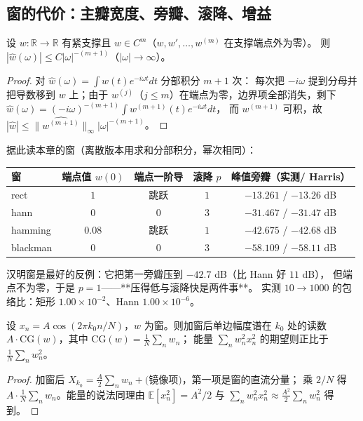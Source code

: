 \subsection{窗的代价：主瓣宽度、旁瓣、滚降、增益}

\begin{lemma}[端点光滑度决定滚降幂次]
\label{lem:rolloff}
设 $w:\mathbb R\to\mathbb R$ 有紧支撑且 $w\in C^m$（$w,w',\dots,w^{(m)}$ 在支撑端点外为零）。
则 $|\hat w(\omega)|\le C|\omega|^{-(m+1)}$（$|\omega|\to\infty$）。
\end{lemma}

\begin{proof}
对 $\hat w(\omega)=\int w(t)e^{-i\omega t}dt$ 分部积分 $m+1$ 次：
每次把 $-i\omega$ 提到分母并把导数移到 $w$ 上；由于
$w^{(j)}$（$j\le m$）在端点为零，边界项全部消失，剩下
$\hat w(\omega)=(-i\omega)^{-(m+1)}\int w^{(m+1)}(t)e^{-i\omega t}dt$，
而 $w^{(m+1)}$ 可积，故 $|\hat w|\le\|\hat{w^{(m+1)}}\|_\infty|\omega|^{-(m+1)}$。
\end{proof}

据此读本章的窗（离散版本用求和分部积分，幂次相同）：

\begin{center}
\begin{tabular}{lcccc}
窗 & 端点值 $w(0)$ & 端点一阶导 & 滚降 $p$ & 峰值旁瓣（实测/ Harris）\\
\hline
rect & $1$ & 跳跃 & $1$ & $-13.261$ / $-13.26$ dB\\
hann & $0$ & $0$ & $3$ & $-31.467$ / $-31.47$ dB\\
hamming & $0.08$ & 跳跃 & $1$ & $-42.675$ / $-42.68$ dB\\
blackman & $0$ & $0$ & $3$ & $-58.109$ / $-58.11$ dB\\
\end{tabular}
\end{center}

汉明窗是最好的反例：它把第一旁瓣压到 $-42.7$ dB（比 Hann 好 $11$ dB），
但端点不为零，于是 $p=1$——**压得低与滚降快是两件事**。
实测 $10\to1000$ 的包络比：矩形 $1.00\times10^{-2}$、Hann $1.00\times10^{-6}$。

\begin{theorem}[加窗的幅度代价 = 相干增益]
\label{thm:coherent-gain}
设 $x_n=A\cos(2\pi k_0n/N)$，$w$ 为窗。则加窗后单边幅度谱在 $k_0$ 处的读数
$A\cdot\mathrm{CG}(w)$，其中 $\mathrm{CG}(w)=\frac1N\sum_n w_n$；
能量 $\sum_n w_n^2 x_n^2$ 的期望则正比于 $\frac1N\sum_nw_n^2$。
\end{theorem}

\begin{proof}
加窗后 $X_{k_0}=\frac A2\sum_n w_n+\text{(镜像项)}$，第一项是窗的直流分量；
乘 $2/N$ 得 $A\cdot\frac1N\sum_nw_n$。能量的说法同理由
$\mathbb E[x_n^2]=A^2/2$ 与 $\sum_n w_n^2x_n^2\approx\frac{A^2}2\sum_nw_n^2$ 得到。
\end{proof}

